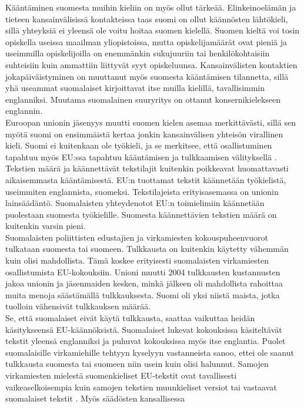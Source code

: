 \begin{multicols}{2}
Kääntäminen suomesta muihin kieliin on myös ollut
tärkeää. Elinkeinoelämän ja tieteen kansainvälisissä kontakteissa taas
suomi on ollut käännösten lähtökieli, sillä yhteyksiä ei yleensä ole
voitu hoitaa suomen kielellä. Suomen kieltä voi tosin opiskella
useissa maailman yliopistoissa, mutta opiskelijamäärät ovat pieniä ja
useimmilla opiskelijoilla on enemmänkin sukujuuriin tai
henkilökohtaisiin suhteisiin kuin ammattiin liittyvät syyt
opiskeluunsa. Kansainvälisten kontaktien jokapäiväistyminen on
muuttanut myös suomesta kääntämisen tilannetta, sillä yhä useammat
suomalaiset kirjoittavat itse muilla kielillä, tavallisimmin
englanniksi. Muutama suomalainen suuryritys on ottanut
konsernikielekseen englannin.\\
Euroopan unionin jäsenyys muutti suomen kielen asemaa merkittävästi,
sillä sen myötä suomi on ensimmäistä kertaa jonkin kansainvälisen
yhteisön virallinen kieli. Suomi ei kuitenkaan ole työkieli, ja se
merkitsee, että osallistuminen tapahtuu myös EU:ssa tapahtuu
kääntämisen ja tulkkaamisen välityksellä \cite{Tulevaisuus2009}.
Tekstien määrä ja käännettävät tekstilajit kuitenkin poikkeavat
huomattavasti aikaisemmasta kääntämisestä. EU:n tuottamat tekstit
käännetään työkielistä, useimmiten englannista, suomeksi.
Tekstilajeista erityisasemassa on unionin lainsäädäntö. Suomalaisten
yhteydenotot EU:n toimielimiin käännetään puolestaan suomesta
työkielille. Suomesta käännettävien tekstien määrä on kuitenkin varsin
pieni.\\
Suomalaisten poliittisten edustajien ja virkamiesten
kokouspuheenvuorot tulkataan suomesta tai suomeen. Tulkkausta on
kuitenkin käytetty vähemmän kuin olisi mahdollista. Tämä koskee
erityisesti suomalaisten virkamiesten osallistumista
EU-kokouksiin. Unioni muutti 2004 tulkkausten kustannusten jakoa
unionin ja jäsenmaiden kesken, minkä jälkeen oli mahdollista rahoittaa
muita menoja säästämällä tulkkauksesta. Suomi oli yksi niistä maista,
jotka tuolloin vähensivät tulkkauksen määrää.\\
Se, että suomalaiset eivät käytä tulkkausta, saattaa vaikuttaa heidän
käsitykseensä EU-käännöksistä. Suomalaiset lukevat kokouksissa
käsiteltävät tekstit yleensä englanniksi ja puhuvat kokouksissa myös
itse englantia. Puolet suomalaisille virkamiehille tehtyyn kyselyyn
vastanneista sanoo, ettei ole saanut tulkkausta suomesta tai suomeen
niin usein kuin olisi halunnut. Samojen virkamiesten mielestä
suomenkieliset EU-tekstit ovat tavallisesti vaikeaselkoisempia kuin
samojen tekstien muunkieliset versiot tai vastaavat suomalaiset
tekstit \cite{Piehl2008}. Myös säädösten kansallisessa

\end{multicols}
